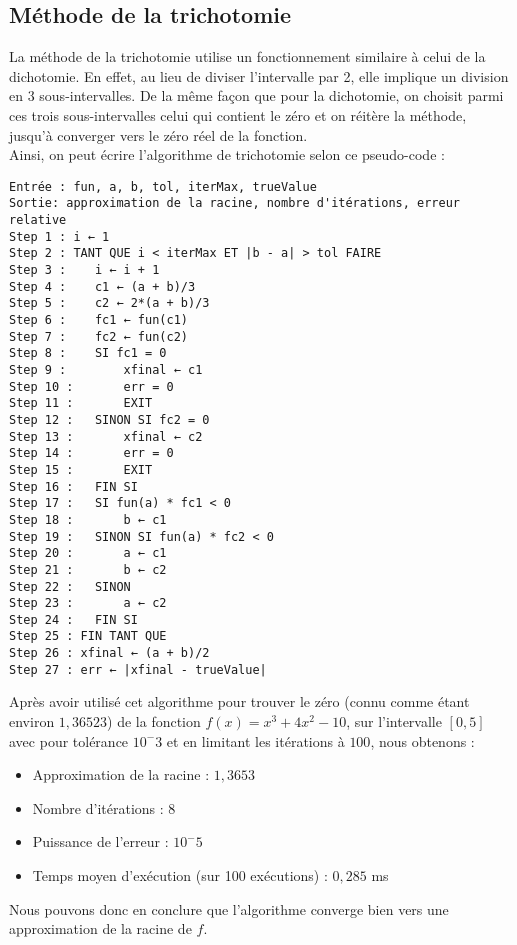 \documentclass[12pt]{article}
\begin{document}
\subsection{Méthode de la trichotomie}
\label{ref:trichotomie}
\noindent La méthode de la trichotomie utilise un fonctionnement similaire à celui de la dichotomie. En effet, au lieu de diviser l'intervalle par 2, elle implique un division en 3 sous-intervalles. De la même façon que pour la dichotomie, on choisit parmi ces trois sous-intervalles celui qui contient le zéro et on réitère la méthode, jusqu'à converger vers le zéro réel de la fonction.\\
Ainsi, on peut écrire l'algorithme de trichotomie selon ce pseudo-code :
\begin{verbatim}
Entrée : fun, a, b, tol, iterMax, trueValue
Sortie: approximation de la racine, nombre d'itérations, erreur relative
Step 1 : i ← 1
Step 2 : TANT QUE i < iterMax ET |b - a| > tol FAIRE
Step 3 :    i ← i + 1
Step 4 :    c1 ← (a + b)/3
Step 5 :    c2 ← 2*(a + b)/3
Step 6 :    fc1 ← fun(c1)
Step 7 :    fc2 ← fun(c2)
Step 8 :    SI fc1 = 0
Step 9 :        xfinal ← c1
Step 10 :       err = 0
Step 11 :       EXIT
Step 12 :   SINON SI fc2 = 0
Step 13 :       xfinal ← c2
Step 14 :       err = 0
Step 15 :       EXIT
Step 16 :   FIN SI
Step 17 :   SI fun(a) * fc1 < 0
Step 18 :       b ← c1
Step 19 :   SINON SI fun(a) * fc2 < 0
Step 20 :       a ← c1
Step 21 :       b ← c2
Step 22 :   SINON
Step 23 :       a ← c2
Step 24 :   FIN SI
Step 25 : FIN TANT QUE
Step 26 : xfinal ← (a + b)/2
Step 27 : err ← |xfinal - trueValue|
\end{verbatim}
\noindent Après avoir utilisé cet algorithme pour trouver le zéro (connu comme étant environ $1,36523$) de la fonction $f(x) = x^3 + 4x^2 -10$, sur l'intervalle $[0,5]$ avec pour tolérance $10^-3$ et en limitant les itérations à $100$, nous obtenons :
\begin{itemize}
    \item Approximation de la racine : $1,3653$
    \item Nombre d'itérations : $8$
    \item Puissance de l'erreur : $10^-5$
    \item Temps moyen d'exécution (sur 100 exécutions) : $0,285$ ms
\end{itemize}
Nous pouvons donc en conclure que l'algorithme converge bien vers une approximation de la racine de $f$.


\end{document}
